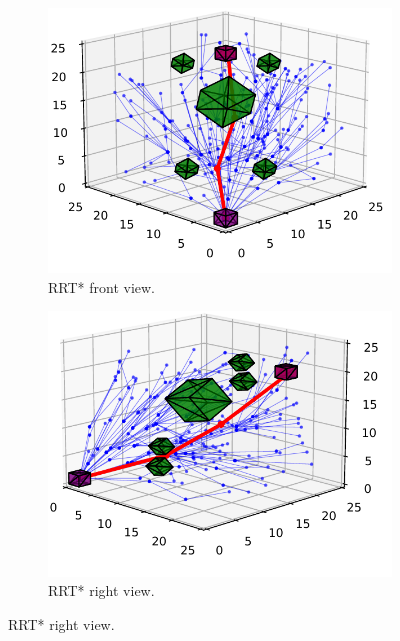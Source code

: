 \documentclass{ctuthesis}
\begin{document}
\begin{figure}[!ht]
  \centering 
  \begin{subfigure}[b]{0.49\textwidth}
      \includegraphics[width=\textwidth]{figChap5/6D_RRTstarFront.pdf}
      \caption{RRT* front view.}
  \end{subfigure}  
  \begin{subfigure}[b]{0.49\textwidth}
      \includegraphics[width=\textwidth]{figChap5/6D_RRTstarRight.pdf}
      \caption{RRT* right view.}

\end{subfigure}
\end{figure}
\end{document}
